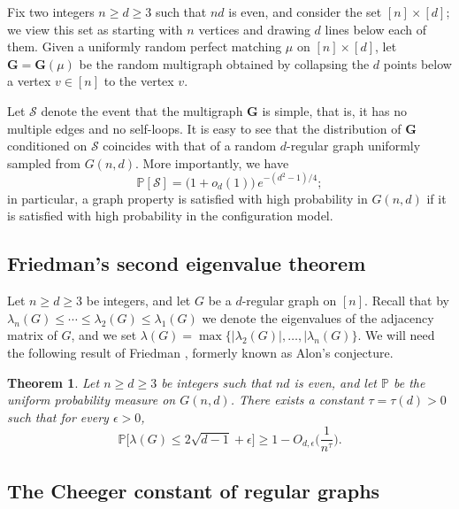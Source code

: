 \documentclass[11pt,leqno]{amsart}
\newtheorem{theorem}{Theorem}[section]
\theoremstyle{remark}
\theoremstyle{plain}
\begin{document}
Fix two integers $n\geqslant d\geqslant 3$ such that $nd$ is even, and consider the set $[n]\times [d]$;
we view this set as starting with $n$ vertices and drawing $d$ lines below each of them.
Given a uniformly random perfect matching $\mu$ on $[n]\times [d]$, let $\mathbf{G}=\mathbf{G}(\mu)$
be the random multigraph obtained by collapsing the $d$ points below a vertex $v\in [n]$ to the vertex $v$.

Let $\mathcal{S}$ denote the event that the multigraph $\mathbf{G}$ is simple, that is, it has no multiple
edges and no self-loops. It is easy to see that the distribution of $\mathbf{G}$ conditioned on $\mathcal{S}$ coincides
with that of a random $d$-regular graph uniformly sampled from $G(n,d)$. More importantly, we have
\begin{equation} \label{e-ra-s-1}
\mathbb{P}[\mathcal{S}] = \big(1+o_d(1)\big)\, e^{-(d^2-1)/4};
\end{equation}
in particular, a graph property is satisfied with high probability in $G(n,d)$ if it is satisfied
with high probability in the configuration model.

\subsection*{Friedman's second eigenvalue theorem}

Let $n \geqslant d\geqslant 3$ be integers, and let $G$ be a $d$-regular graph on $[n]$. Recall that by
$\lambda_n(G)\leqslant \cdots \leqslant \lambda_2(G) \leqslant \lambda_1(G)$ we denote
the eigenvalues of the adjacency matrix of $G$, and we set
$\lambda(G)=\max\big\{ |\lambda_2(G)|,\dots,|\lambda_n(G)\big\}$.
We will need the following result of Friedman \cite{Fr08}, formerly known as Alon's conjecture.
\begin{theorem} \label{Friedman}
Let $n\geqslant d\geqslant 3$ be integers such that $nd$ is even, and let $\mathbb{P}$ be the uniform probability measure on $G(n,d)$.
There exists a constant $\tau=\tau(d)>0$ such that for every $\epsilon>0$,
\[ \mathbb{P}\big[ \lambda(G) \leqslant 2\sqrt{d-1} + \epsilon \big] \geqslant
1- O_{d,\epsilon}\Big( \frac{1}{n^{\tau}}\Big). \]
\end{theorem}

\subsection*{The Cheeger constant of regular graphs}
\end{document}
